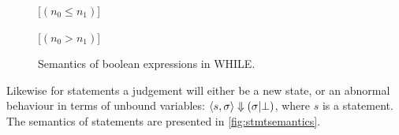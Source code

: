 \begin{figure}[h!]
\inference[BCst]{}
{}

{}

{}

{}

{}[$(n_0 \leq n_1)$]

{}[$(n_0 > n_1)$]

{}

{}

{}

{}

{}

\label{fig:bexprsemantics}
\caption{Semantics of boolean expressions in WHILE.}
\end{figure}

Likewise for statements a judgement will either be a new state, or an abnormal behaviour in terms of unbound variables: $\langle s, \sigma \rangle \Downarrow (\sigma | \bot)$, where $s$ is a statement.
The semantics of statements are presented in \autoref{fig:stmtsemantics}.

